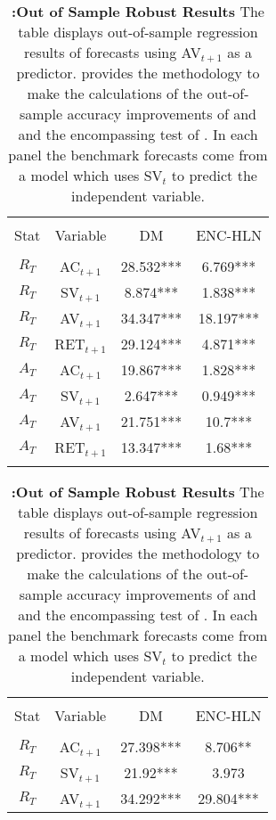 \begin{table}[!htbp]
	\centering \caption{\textbf{:Out of Sample Robust Results} \newline
		\footnotesize{The table displays out-of-sample regression results of forecasts using AV$_{t+1}$ as a predictor. \citet{rossi_out--sample_2012} provides the methodology to make the calculations of the out-of-sample accuracy improvements of \citet{Diebold1995} and \citet{mccracken_asymptotics_2007} and the encompassing test of \citet{harvey_tests_1998}.  In each panel the benchmark forecasts come from a model which uses SV$_{t}$ to predict the independent variable.}}
	\label{tab:tab_out_sample_robust}
	\begin{adjustbox}{center,max height=\totalheight}
		\begin{tabular}{cccc}
			\hline\\[-1.8ex]
			 Stat & Variable & DM & ENC-HLN \\
			 \hline\\[-1.8ex]
			 $R_{T}$ & AC$_{t+1}$ & 28.532*** & 6.769*** \\
			 $R_{T}$ & SV$_{t+1}$ & 8.874*** & 1.838*** \\
			 $R_{T}$ & AV$_{t+1}$ & 34.347*** & 18.197*** \\
			 $R_{T}$ & RET$_{t+1}$ & 29.124*** & 4.871*** \\
			 $A_{T}$ & AC$_{t+1}$ & 19.867*** & 1.828*** \\
			 $A_{T}$ & SV$_{t+1}$ & 2.647*** & 0.949*** \\
			 $A_{T}$ & AV$_{t+1}$ & 21.751*** & 10.7*** \\
			 $A_{T}$ & RET$_{t+1}$ & 13.347*** & 1.68*** \\
			 \hline\\
			 		\end{tabular}
			 	\end{adjustbox}
\begin{adjustbox}{center,max height=\totalheight}
	\begin{tabular}{cccc}
		\hline\\[-1.8ex]
			  Stat & Variable & DM & ENC-HLN \\
			  \hline\\[-1.8ex]
$R_{T}$ & AC$_{t+1}$ & 27.398*** & 8.706** \\
$R_{T}$ & SV$_{t+1}$ & 21.92*** & 3.973 \\
$R_{T}$ & AV$_{t+1}$ & 34.292*** & 29.804*** \\

\end{tabular}
\end{adjustbox}
\end{table}

